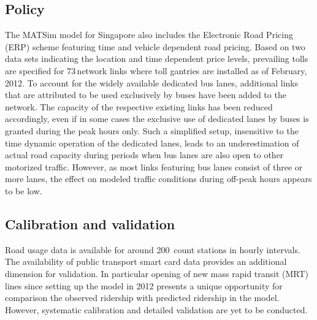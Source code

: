 \subsection{Policy}
The MATSim model for Singapore also includes the Electronic Road Pricing (ERP) scheme featuring time and vehicle dependent road pricing. Based on two data sets indicating the location and time dependent price levels, prevailing tolls are specified for 73\,network links where toll gantries are installed as of February, 2012. To account for the widely available dedicated bus lanes, additional links that are attributed to be used exclusively by buses have been added to the network. The capacity of the respective existing links has been reduced accordingly, even if in some cases the exclusive use of dedicated lanes by buses is granted during the peak hours only. Such a simplified setup, insensitive to the time dynamic operation of the dedicated lanes, leads to an underestimation of actual road capacity during periods when bus lanes are also open to other motorized traffic. However, as most links featuring bus lanes consist of three or more lanes, the effect on modeled traffic conditions during off-peak hours appears to be low.

\subsection{Calibration and validation}
Road usage data is available for around 200\, 
count stations in hourly intervals. The availability of public transport smart card data provides an additional dimension for validation. In particular opening of new mass rapid transit (MRT) lines since setting up the model in 2012 presents a unique opportunity for comparison the observed ridership with predicted ridership in the model. However, systematic calibration and detailed validation are yet to be conducted.

